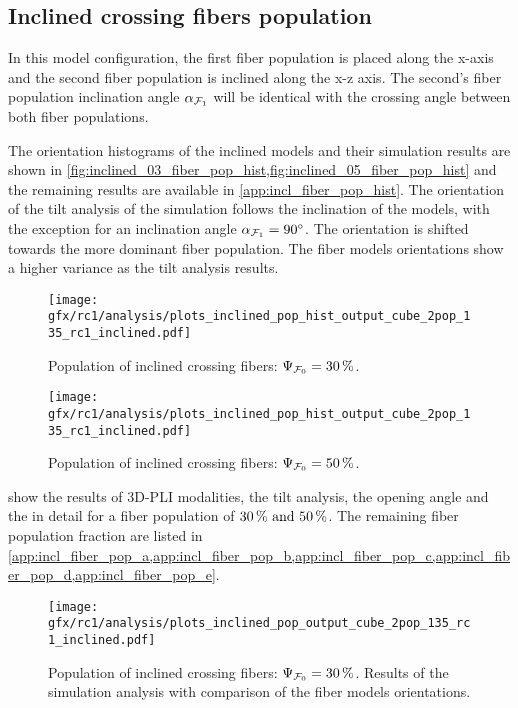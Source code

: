 \subsection{Inclined crossing fibers population}
\label{sec:resInclCross}
%
In this model configuration, the first fiber population \popa{} is placed along the x-axis and the second fiber population is inclined along the x-z axis.
The second's fiber population inclination angle $\textnormal{$\alpha$}_{\textnormal{$\mathcal{F}_1$}}$ will be identical with the crossing angle \modelOmega{} between both fiber populations.
\par
%
The orientation histograms of the inclined models and their simulation results are shown in \cref{fig:inclined_03_fiber_pop_hist,fig:inclined_05_fiber_pop_hist} and the remaining results are available in \cref{app:incl_fiber_pop_hist}.
The orientation of the tilt analysis of the simulation follows the inclination of the models, with the exception for an inclination angle $\textnormal{$\alpha$}_{\textnormal{$\mathcal{F}_1$}} = \SI{90}{\degree}$.
The orientation is shifted towards the more dominant fiber population.
The fiber models orientations show a higher variance as the tilt analysis results.
\par
%
\begin{figure}[!p]
\centering
\texttt{[image: gfx/rc1/analysis/plots\_inclined\_pop\_hist\_output\_cube\_2pop\_135\_rc1\_inclined.pdf]}
\caption[]{Population of inclined crossing fibers: $\textnormal{$\Psi_{\textnormal{$\mathcal{F}_0$}}$}=\SI{30}{\percent}$.
}
\label{fig:inclined_03_fiber_pop_hist}
%
\vspace{2em}
\texttt{[image: gfx/rc1/analysis/plots\_inclined\_pop\_hist\_output\_cube\_2pop\_135\_rc1\_inclined.pdf]}
\caption[]{Population of inclined crossing fibers: $\textnormal{$\Psi_{\textnormal{$\mathcal{F}_0$}}$}=\SI{50}{\percent}$.
}
\label{fig:inclined_05_fiber_pop_hist}
\end{figure}
%
 show the results of \ac{3D-PLI} modalities, the tilt analysis, the opening angle and the \accvalue{} in detail for a fiber population of $\SIlist{30;50}{\percent}$.%
The remaining fiber population fraction are listed in \cref{app:incl_fiber_pop_a,app:incl_fiber_pop_b,app:incl_fiber_pop_c,app:incl_fiber_pop_d,app:incl_fiber_pop_e}.
\par
%
\begin{figure}[!p]
    \centering
    \texttt{[image: gfx/rc1/analysis/plots\_inclined\_pop\_output\_cube\_2pop\_135\_rc1\_inclined.pdf]}
    \caption[]{Population of inclined crossing fibers: $\textnormal{$\Psi_{\textnormal{$\mathcal{F}_0$}}$}=\SI{30}{\percent}$. Results of the simulation analysis with comparison of the fiber models orientations.}
    \label{fig:inclined_03_fiber_pop_rofl}
    \end{figure}
